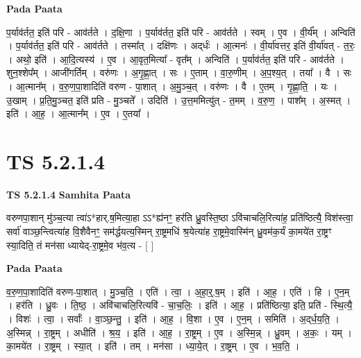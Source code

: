 \documentclass[17pt]{extarticle}
\begin{document}
\textbf{Pada Paata} \newline

प॒र्याव॑र्तत॒ इति॑ परि - आव॑र्तते । द॒क्षि॒णा । प॒र्याव॑र्तत॒ इति॑ परि - आव॑र्तते । स्वम् । ए॒व । वी॒र्य᳚म् । अन्विति॑ । प॒र्याव॑र्तत॒ इति॑ परि - आव॑र्तते । तस्मा᳚त् । दक्षि॑णः । अद्‌र्धः॑ । आ॒त्मनः॑ । वी॒र्या॑वत्तर॒ इति॑ वी॒र्या॑वत् - त॒रः॒ । अथो॒ इति॑ । आ॒दि॒त्यस्य॑ । ए॒व । आ॒वृत॒मित्या᳚ - वृत᳚म् । अन्विति॑ । प॒र्याव॑र्तत॒ इति॑ परि - आव॑र्तते । शुन॒श्शेप᳚म् । आजी॑गर्तिम् । वरु॑णः । अ॒गृ॒ह्णा॒त् । सः । ए॒ताम् । वा॒रु॒णीम् । अ॒प॒श्य॒त् । तया᳚ । वै । सः । आ॒त्मान᳚म् । व॒रु॒ण॒पा॒शादिति॑ वरुण - पा॒शात् । अ॒मु॒ञ्च॒त् । वरु॑णः । वै । ए॒तम् । गृ॒ह्णा॒ति॒ । यः । उ॒खाम् । प्र॒ति॒मु॒ञ्चत॒ इति॑ प्रति - मु॒ञ्चते᳚ । उदिति॑ । उ॒त्त॒ममित्यु॑त् - त॒मम् । व॒रु॒ण॒ । पाश᳚म् । अ॒स्मत् । इति॑ । आ॒ह॒ । आ॒त्मान᳚म् । ए॒व । ए॒तया᳚ ।  \newline




\section*{ TS 5.2.1.4 }

\textbf{TS 5.2.1.4 } \newline
\textbf{Samhita Paata} \newline

वरुणपा॒शान् मु॑ञ्च॒त्या त्वा॑ऽ*हार्.ष॒मित्या॒हा ऽऽ*ह्य॑नꣳ॒॒ हर॑ति ध्रु॒वस्ति॒ष्ठा ऽवि॑चाचलि॒रित्या॑ह॒ प्रति॑ष्ठित्यै॒ विश॑स्त्वा॒ सर्वा॑ वाञ्छ॒न्त्वित्या॑ह वि॒शैवैनꣳ॒॒ सम॑र्द्धयत्य॒स्मिन् रा॒ष्ट्रमधि॑ श्र॒येत्या॑ह रा॒ष्ट्रमे॒वास्मि॑न् ध्रु॒वम॑क॒र्यं का॒मये॑त रा॒ष्ट्रꣳ स्या॒दिति॒ तं मन॑सा ध्यायेद्-रा॒ष्ट्रमे॒व भ॑व॒त्य - [  ] \newline

\textbf{Pada Paata} \newline

व॒रु॒ण॒पा॒शादिति॑ वरुण-पा॒शात् । मु॒ञ्च॒ति॒ । एति॑ । त्वा॒ । अ॒हा॒र्॒.ष॒म् । इति॑ । आ॒ह॒ । एति॑ । हि । ए॒न॒म् । हर॑ति । ध्रु॒वः । ति॒ष्ठ॒ । अवि॑चाचलि॒रित्यवि॑ - चा॒च॒लिः॒ । इति॑ । आ॒ह॒ । प्रति॑ष्ठित्या॒ इति॒ प्रति॑ - स्थि॒त्यै॒ । विशः॑ । त्वा॒ । सर्वाः᳚ । वा॒ञ्छ॒न्तु॒ । इति॑ । आ॒ह॒ । वि॒शा । ए॒व । ए॒न॒म् । समिति॑ । अ॒द्‌र्ध॒य॒ति॒ । अ॒स्मिन्न् । रा॒ष्ट्रम् । अधीति॑ । श्र॒य॒ । इति॑ । आ॒ह॒ । रा॒ष्ट्रम् । ए॒व । अ॒स्मि॒न्न् । ध्रु॒वम् । अ॒कः॒ । यम् । का॒मये॑त । रा॒ष्ट्रम् । स्या॒त् । इति॑ । तम् । मन॑सा । ध्या॒ये॒त् । रा॒ष्ट्रम् । ए॒व । भ॒व॒ति॒ ।  \newline
\end{document}
